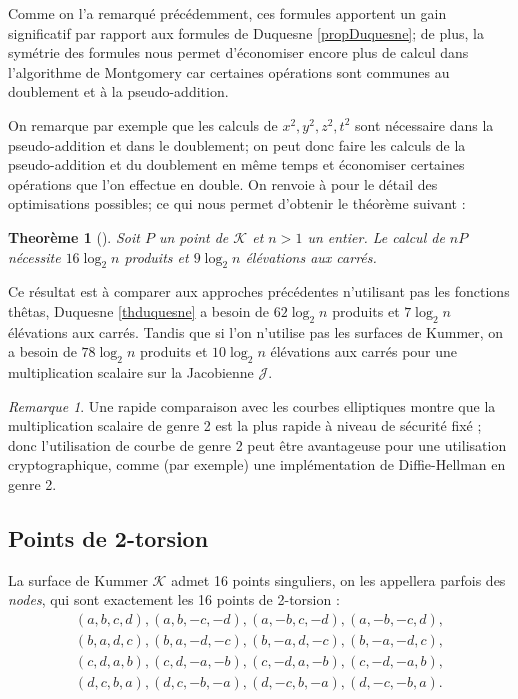 \documentclass[a4paper]{article}
\newtheorem{theoreme}{Theorème}[section]
\theoremstyle{definition}
\theoremstyle{remark}
\newtheorem{remarque}{Remarque}
\numberwithin{equation}{section}
\begin{document}
Comme on l'a remarqué précédemment, ces formules apportent un gain significatif par rapport aux formules de Duquesne \ref{propDuquesne}; de plus, la symétrie des formules nous permet d'économiser encore plus de calcul dans l'algorithme de Montgomery car certaines opérations sont communes au doublement et à la pseudo-addition.

On remarque par exemple que les calculs de $x^2,y^2,z^2,t^2$ sont nécessaire dans la pseudo-addition et dans le doublement; on peut donc faire les calculs de la pseudo-addition et du doublement en même temps et économiser certaines opérations que l'on effectue en double. On renvoie à \citep{gaudry} pour le détail des optimisations possibles; ce qui nous permet d'obtenir le théorème suivant :
\begin{theoreme}[\citet{gaudry}]
\label{mulscal}
Soit $P$ un point de $\mathcal{K}$ et $n > 1$ un entier. Le calcul de $nP$ nécessite $16\log_2 n$ produits et $9\log_2 n$ élévations aux carrés.
\end{theoreme}

Ce résultat est à comparer aux approches précédentes n'utilisant pas les fonctions thêtas, Duquesne \ref{thduquesne} a besoin de $62\log_2 n$ produits et $7\log_2 n$ élévations aux carrés. Tandis que si l'on n'utilise pas les surfaces de Kummer, on a besoin de $78\log_2 n$ produits et $10\log_2 n$ élévations aux carrés pour une multiplication scalaire sur la Jacobienne $\mathcal{J}$.

\begin{remarque}
Une rapide comparaison avec les courbes elliptiques montre que la multiplication scalaire de genre 2 est la plus rapide à niveau de sécurité fixé \citep[5.5]{gaudry}; donc l'utilisation de courbe de genre 2 peut être avantageuse pour une utilisation cryptographique, comme (par exemple) une implémentation de Diffie-Hellman en genre 2.
\end{remarque}

\subsection{Points de 2-torsion}

La surface de Kummer $\mathcal{K}$ admet 16 points singuliers, on les appellera parfois des \emph{nodes}, qui sont exactement les 16 points de 2-torsion :
\begin{align*}
   &(a,b,c,d),(a,b,-c,-d),(a,-b,c,-d),(a,-b,-c,d),& \\
   &(b,a,d,c),(b,a,-d,-c),(b,-a,d,-c),(b,-a,-d,c),& \\
   &(c,d,a,b),(c,d,-a,-b),(c,-d,a,-b),(c,-d,-a,b),& \\
   &(d,c,b,a),(d,c,-b,-a),(d,-c,b,-a),(d,-c,-b,a).&
\end{align*}
\end{document}
